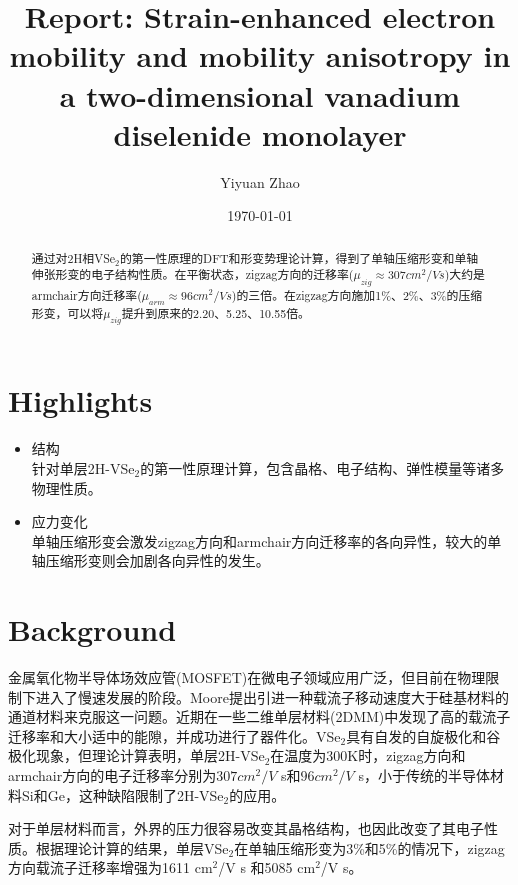 \documentclass[reprint, aps, prb, showkeys]{revtex4-2}
\begin{document}
\title{Report: Strain-enhanced electron mobility and mobility anisotropy in a two-dimensional vanadium diselenide monolayer}

\author{Yiyuan Zhao}
\date{\today}

\begin{abstract}
通过对2H相VSe$_2$的第一性原理的DFT和形变势理论计算，得到了单轴压缩形变和单轴伸张形变的电子结构性质。在平衡状态，zigzag方向的迁移率($\mu_{zig} \approx 307 cm^2/V s$)大约是armchair方向迁移率($\mu_{arm} \approx 96 cm^2/V s$)的三倍。在zigzag方向施加1\%、2\%、3\%的压缩形变，可以将$\mu_{zig}$提升到原来的2.20、5.25、10.55倍。
\end{abstract}


\maketitle
\section{Highlights}
\begin{itemize}
    \item 结构 \\
    针对单层2H-VSe$_2$的第一性原理计算，包含晶格、电子结构、弹性模量等诸多物理性质。
    \item 应力变化 \\
    单轴压缩形变会激发zigzag方向和armchair方向迁移率的各向异性，较大的单轴压缩形变则会加剧各向异性的发生。
\end{itemize}


\section{Background}
金属氧化物半导体场效应管(MOSFET)在微电子领域应用广泛，但目前在物理限制下进入了慢速发展的阶段。Moore提出引进一种载流子移动速度大于硅基材料的通道材料来克服这一问题。近期在一些二维单层材料(2DMM)中发现了高的载流子迁移率和大小适中的能隙，并成功进行了器件化。VSe$_2$具有自发的自旋极化和谷极化现象，但理论计算表明，单层2H-VSe$_2$在温度为300K时，zigzag方向和armchair方向的电子迁移率分别为$307 cm^2/V$ s和$96 cm^2/V$ s，小于传统的半导体材料Si和Ge，这种缺陷限制了2H-VSe$_2$的应用。

对于单层材料而言，外界的压力很容易改变其晶格结构，也因此改变了其电子性质。根据理论计算的结果，单层VSe$_2$在单轴压缩形变为3\%和5\%的情况下，zigzag方向载流子迁移率增强为1611 cm$^2$/V s 和5085 cm$^2$/V s\cite{doi:10.1063/5.0048884}。
\end{document}
